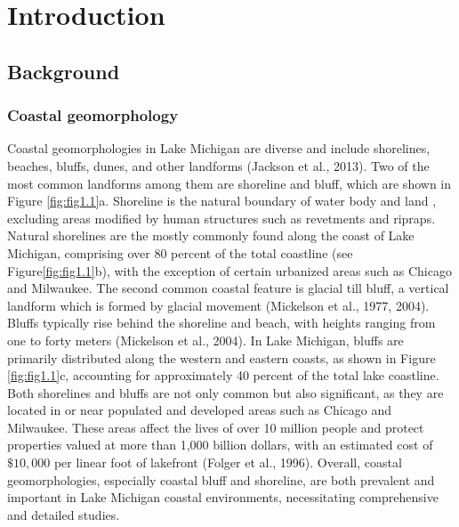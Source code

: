 \chapter{Introduction}
\label{ch:Introduction}

\section{Background}
\label{sec:Background}

\subsection{Coastal geomorphology}
\label{subsec:Coastal geomorphology}

Coastal geomorphologies in Lake Michigan are diverse and include shorelines, beaches, bluffs, dunes, and other landforms (Jackson et al., 2013). Two of the most common landforms among them are shoreline and bluff, which are shown in Figure \ref{fig:fig1.1}a. Shoreline is the natural boundary of water body and land , excluding areas modified by human structures such as revetments and ripraps. Natural shorelines are the mostly commonly found along the coast of Lake Michigan, comprising over 80 percent of the total coastline (see Figure\ref{fig:fig1.1}b), with the exception of certain urbanized areas such as Chicago and Milwaukee. The second common coastal feature is glacial till bluff, a vertical landform which is formed by glacial movement (Mickelson et al., 1977, 2004). Bluffs typically rise behind the shoreline and beach, with heights ranging from one to forty meters (Mickelson et al., 2004). In Lake Michigan, bluffs are primarily distributed along the western and eastern coasts, as shown in Figure \ref{fig:fig1.1}c, accounting for approximately 40 percent of the total lake coastline. Both shorelines and bluffs are not only common but also significant, as they are located in or near populated and developed areas such as Chicago and Milwaukee. These areas affect the lives of over 10 million people and protect properties valued at more than 1,000 billion dollars, with an estimated cost of $ \$10,000$ per linear foot of lakefront (Folger et al., 1996). Overall, coastal geomorphologies, especially coastal bluff and shoreline, are both prevalent and important in Lake Michigan coastal environments, necessitating comprehensive and detailed studies.
